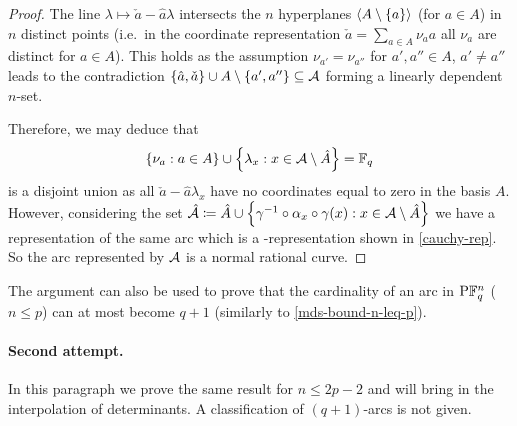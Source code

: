 \begin{proof}
    The line $\lambda\mapsto \check a-\hat a\lambda$ intersects the $n$ hyperplanes $\gen{A\setminus\set a}$ (for $a\in A$) in $n$ distinct points (i.e.~in the coordinate representation $\check a =\sum_{a\in A}{\nu_a a}$ all $\nu_a$ are distinct for $a\in A$). This holds as the assumption $\nu_{a'}=\nu_{a''}$ for $a',a''\in A$, $a'\neq a''$ leads to the contradiction $\set{\hat a,\check a}\setjoin A\setminus\set{a',a''}\setleq \cA$ forming a linearly dependent $n$-set.

    Therefore, we may deduce that
    $$
    \set{\nu_a:a\in A}\setjoin\set{\lambda_x:x\in \cA\setminus\hat A}=\field{q}
    $$ is a disjoint union as all $\check a-\hat a\lambda_x$ have no coordinates equal to zero in the basis $A$. However, considering the set $\hat\cA\defeq \hat A\setjoin\set{\gamma^{-1}\compose\alpha_x\compose\gamma(x):x\in \cA\setminus\hat A}$ we have a representation of the same arc which is a -representation shown in \autoref{cauchy-rep}. So the arc represented by $\mathcal{A}$ is a normal rational curve.
\end{proof}

\begin{remark}
    The argument can also be used to prove that the cardinality of an arc in $\P \field{q}^n$ ($n\leq p$) can at most become $q+1$ (similarly to \autoref{mds-bound-n-leq-p}).
\end{remark}

\paragraph{Second attempt.} In this paragraph we prove the same result for $n\leq 2p-2$ and will bring in the interpolation of determinants. A classification of $(q+1)$-arcs is not given.

